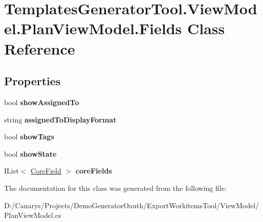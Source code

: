 \hypertarget{class_templates_generator_tool_1_1_view_model_1_1_plan_view_model_1_1_fields}{}\section{Templates\+Generator\+Tool.\+View\+Model.\+Plan\+View\+Model.\+Fields Class Reference}
\label{class_templates_generator_tool_1_1_view_model_1_1_plan_view_model_1_1_fields}
\subsection*{Properties}
\begin{DoxyCompactItemize}
\item 
\mbox{\label{class_templates_generator_tool_1_1_view_model_1_1_plan_view_model_1_1_fields_ac18396161a54bf37afb51f3dbd4fd77b}} 
bool {\bfseries show\+Assigned\+To}
\item 
\mbox{\label{class_templates_generator_tool_1_1_view_model_1_1_plan_view_model_1_1_fields_adc6f6fa6a979a0faad8816af1a95c809}} 
string {\bfseries assigned\+To\+Display\+Format}
\item 
\mbox{\label{class_templates_generator_tool_1_1_view_model_1_1_plan_view_model_1_1_fields_adcb14b34dcfb582e904fe978e12dcf2e}} 
bool {\bfseries show\+Tags}
\item 
\mbox{\label{class_templates_generator_tool_1_1_view_model_1_1_plan_view_model_1_1_fields_af65c8a98bf919eaf8d3897feb730c3b5}} 
bool {\bfseries show\+State}
\item 
\mbox{\label{class_templates_generator_tool_1_1_view_model_1_1_plan_view_model_1_1_fields_a1614af43206587b1e6997397248d5ef2}} 
I\+List$<$ \mbox{\hyperlink{class_templates_generator_tool_1_1_view_model_1_1_plan_view_model_1_1_core_field}{Core\+Field}} $>$ {\bfseries core\+Fields}
\end{DoxyCompactItemize}


The documentation for this class was generated from the following file\+:\begin{DoxyCompactItemize}
\item 
D\+:/\+Canarys/\+Projects/\+Demo\+Generator\+Oauth/\+Export\+Workitems\+Tool/\+View\+Model/Plan\+View\+Model.\+cs\end{DoxyCompactItemize}

